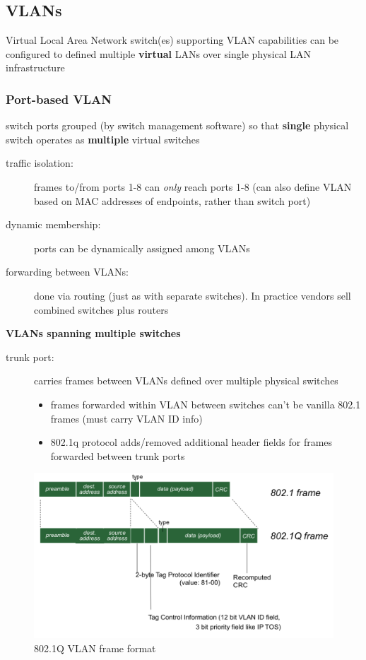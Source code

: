 \subsection{VLANs}
\begin{note}{Virtual Local Area Network}
	switch(es) supporting VLAN capabilities can be configured to defined multiple \textbf{virtual} LANs over single physical LAN infrastructure
\end{note}
\subsubsection{Port-based VLAN}
switch ports grouped (by switch management software) so that \textbf{single} physical switch operates as \textbf{multiple} virtual switches
\begin{description}
	\item[traffic isolation:] frames to/from ports 1-8 can \textit{only} reach ports 1-8 (can also define VLAN based on MAC addresses of endpoints, rather than switch port)
	\item[dynamic membership:] ports can be dynamically assigned among VLANs
	\item[forwarding between VLANs:] done via routing (just as with separate switches). In practice vendors sell combined switches plus routers
\end{description}
\textbf{VLANs spanning multiple switches}
\begin{description}
	\item[trunk port:] carries frames between VLANs defined over multiple physical switches
	\begin{itemize}
		\item frames forwarded within VLAN between switches can't be vanilla 802.1 frames (must carry VLAN ID info)
		\item 802.1q protocol adds/removed additional header fields for frames forwarded between trunk ports
	\end{itemize}
\end{description}
\begin{figure}[H]
	\includegraphics[width=\linewidth]{802q}
	\centering
	\caption{802.1Q VLAN frame format}
\end{figure}